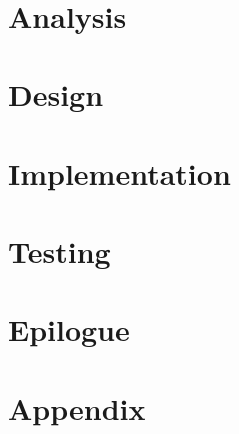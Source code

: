 











		\newpage		\newpage
\cleardoublepage
\ \pagebreak
{}


	\tableofcontents
	\listoffigures
			
\begin{titlepage}
\end{titlepage}

	

\part{Analysis}
\label{analysis}
	
	
	
	
\part{Design}
\label{design}
	
	
	
	
	
 \part{Implementation}
\label{implementation}
	
	
	
	
	
\part{Testing}
\label{testing}
	
	
	
	
\part{Epilogue}
\label{epilogue}
	
	
	
	

\label{chap:bib}


\pagestyle{plain}
\part{Appendix}
\label{Appendix}
\appendix
	
	


	



